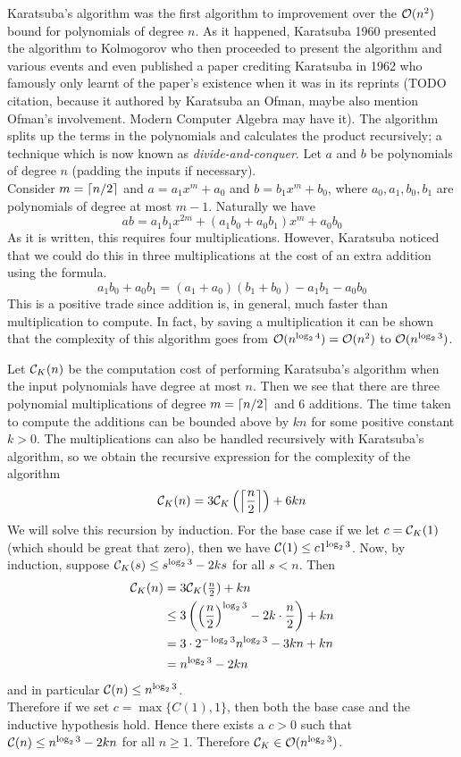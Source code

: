 Karatsuba's algorithm was the first algorithm to improvement over the $\mathcal O(n^2)$ bound for polynomials of degree $n$. As it happened, Karatsuba 1960 presented the algorithm to Kolmogorov who then proceeded to present the algorithm and various events and even published a paper crediting Karatsuba in 1962 \cite{karatsuba} who famously only learnt of the paper's existence when it was in its reprints (TODO citation, because it authored by Karatsuba an Ofman, maybe also mention Ofman's involvement. Modern Computer Algebra may have it). The algorithm splits up the terms in the polynomials and calculates the product recursively; a technique which is now known as \emph{divide-and-conquer}. Let $a$ and $b$ be polynomials of degree $n$ (padding the inputs if necessary).\\
Consider $m = \left \lceil n/2 \right \rceil$ and $a = a_1x^m + a_0$ and $b = b_1x^m + b_0$, where $a_0, a_1, b_0, b_1$ are polynomials of degree at most $m - 1$. Naturally we have
\[
    ab = a_1b_1x^{2m} + (a_1b_0 + a_0b_1)x^m + a_0b_0
\]
As it is written, this requires four multiplications. However, Karatsuba noticed that we could do this in three multiplications at the cost of an extra addition using the formula.
\[
    a_1b_0 + a_0b_1 = (a_1 + a_0)(b_1 + b_0) - a_1b_1 - a_0b_0
\]
This is a positive trade since addition is, in general, much faster than multiplication to compute. In fact, by saving a multiplication it can be shown that the complexity of this algorithm goes from $\mathcal O(n^{\log_2 4}) = \mathcal O(n^2)$ to $\mathcal O(n^{\log_2 3})$.

\medskip 

Let $\mathcal C_K(n)$ be the computation cost of performing Karatsuba's algorithm when the input polynomials have degree at most $n$. Then we see that there are three polynomial multiplications of degree $m = \left \lceil n/2 \right \rceil$ and 6 additions. The time taken to compute the additions can be bounded above by $kn$ for some positive constant $k > 0$. The multiplications can also be handled recursively with Karatsuba's algorithm, so we obtain the recursive expression for the complexity of the algorithm
\[
    \mathcal C_K(n) = 3\mathcal C_K\left(\left \lceil \frac{n}{2} \right \rceil\right) + 6kn
\]
We will solve this recursion by induction.
For the base case if we let $c = \mathcal C_K(1)$ (which should be great that zero), then we have $\mathcal C(1) \le c1^{\log_2 3}$.
Now, by induction, suppose $\mathcal C_K(s) \le s^{\log_2 3} - 2ks$ for all $s < n$. Then
\begin{align*}
    \mathcal C_K(n) &= 3\mathcal C_K(\tfrac{n}{2}) + kn\\
               &\le 3\left(\left(\frac{n}{2}\right)^{\log_2 3} - 2k \cdot \frac{n}{2}\right) + kn\\
               &= 3 \cdot 2^{-\log_2 3}n^{\log_2 3} - 3kn + kn\\
               &= n^{\log_2 3} - 2kn
\end{align*}
and in particular $\mathcal C(n) \le n^{\log_2 3}$.\\
Therefore if we set $c = \max\{C(1), 1\}$, then both the base case and the inductive hypothesis hold. Hence there exists a $c > 0$ such that $\mathcal C(n) \le n^{\log_2 3} - 2kn$ for all $n \ge 1$.
Therefore $\mathcal C_K \in \mathcal O(n^{\log_2 3})$.

